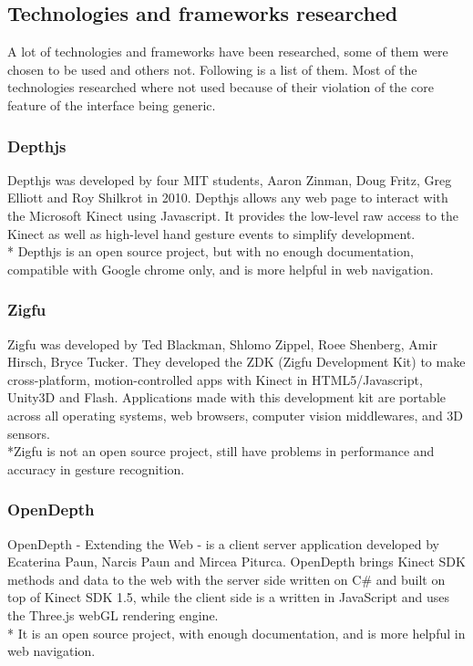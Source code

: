 \documentclass[a4paper]{article}
\begin{document}
\subsection{Technologies and frameworks researched}
A lot of technologies and frameworks have been researched, some of them were chosen to be used and others not. Following is a list of them.
Most of the technologies researched where not used because of their violation of the core feature of the interface being generic.

\subsubsection{Depthjs}
Depthjs was developed by four MIT students, Aaron Zinman, Doug Fritz, Greg Elliott and Roy Shilkrot in 2010. Depthjs allows any web page to interact with the Microsoft Kinect using Javascript. It provides the low-level raw access to the Kinect as well as high-level hand gesture events to simplify development.
\\* Depthjs is an open source project, but with no enough documentation, compatible with Google chrome only, and is more helpful in web navigation.

\newpage

\subsubsection{Zigfu}
Zigfu was developed by Ted Blackman, Shlomo Zippel, Roee Shenberg, Amir Hirsch, Bryce Tucker. They developed the ZDK (Zigfu Development Kit) to make cross-platform, motion-controlled apps with Kinect in HTML5/Javascript, Unity3D and Flash. Applications made with this development kit are portable across all operating systems, web browsers, computer vision middlewares, and 3D sensors. 
\\*Zigfu is not an open source project, still have problems in performance and accuracy in gesture recognition.


\subsubsection{OpenDepth}
OpenDepth - Extending the Web - is a client server application developed by Ecaterina Paun, Narcis Paun and Mircea Piturca. OpenDepth brings Kinect SDK methods and data to the web with the server side written on C\# and built on top of Kinect SDK 1.5, while the client side is a written in JavaScript and uses the Three.js webGL rendering engine.
\\* It is an open source project, with enough documentation, and is more helpful in web navigation.
\end{document}
